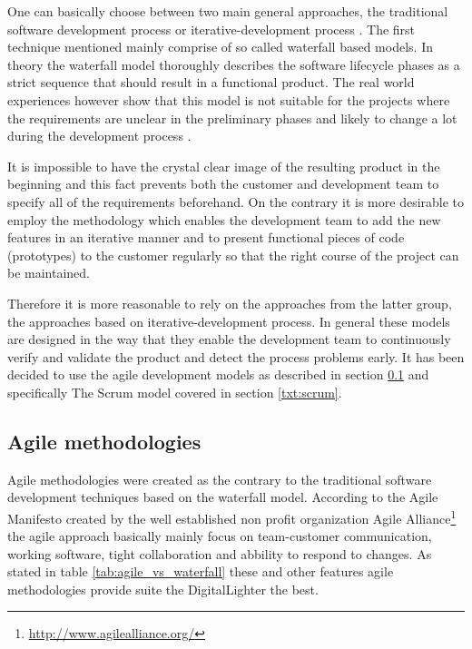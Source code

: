 One can basically choose between two main general approaches, the traditional software development process or iterative-development process \cite{fairley2009managing}. The first technique mentioned mainly comprise of so called waterfall based models. In theory the waterfall model thoroughly describes the software lifecycle phases as a strict sequence that should result in a functional product. The real world experiences however show that this model is not suitable for the projects where the requirements are unclear in the preliminary phases and likely to change a lot during the development process \cite{john2011software}.

It is impossible to have the crystal clear image of the resulting product in the beginning\cite{fairley2009managing} and this fact prevents both the customer and development team to specify all of the requirements beforehand. On the contrary it is more desirable to employ the methodology which enables the development team to add the new features in an iterative manner and to present functional pieces of code (prototypes) to the customer regularly so that the right course of the project can be maintained.

Therefore it is more reasonable to rely on the approaches from the latter group, the approaches based on iterative-development process. In general these models are designed in the way that they enable the development team to continuously verify and validate the product and detect the process problems early. It has been decided to use the agile development models as described in section \ref{txt:agile_methodologies} and specifically The Scrum model covered in section \ref{txt:scrum}.

\subsection{Agile methodologies} \label{txt:agile_methodologies}
Agile methodologies were created as the contrary to the traditional software development techniques based on the waterfall model. According to the Agile Manifesto \cite{agileManifesto} created by the well established non profit organization Agile Alliance\footnote{\url{http://www.agilealliance.org/}} the agile approach basically mainly focus on team-customer communication, working software, tight collaboration and abbility to respond to changes. As stated in table \ref{tab:agile_vs_waterfall} these and other features agile methodologies provide suite the DigitalLighter the best.

